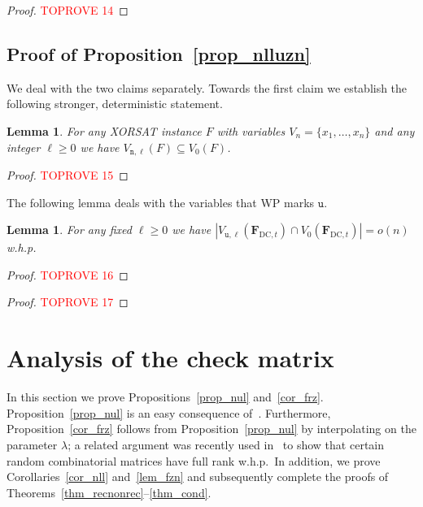 \documentclass[10pt,reqno]{amsart}
\numberwithin{equation}{section}
\renewcommand{\vec}[1]{\boldsymbol{#1}}
\renewcommand{\subset}{\subseteq}
\newcommand{\FDC}[1]{\PHI_{\mathrm{DC},{#1}}}
\newcommand{\frz}{V_0}
\newcommand{\unfrozen}{\mathtt{u}}
\newcommand{\nll}{\mathtt{n}}
\newcommand{\uzn}{\unfrozen}
\newcommand\PHI{\vec F}
\newcommand{\whp}{w.h.p.}
\newcommand\Prop{Proposition}
\newcommand\Thm{Theorem}
\newtheorem{lemma}[definition]{Lemma}
\begin{document}
\begin{proof}\textcolor{red}{TOPROVE 14}\end{proof}


\subsection{Proof of \Prop~\ref{prop_nlluzn}}\label{sec_prop_nlluzn}
We deal with the two claims separately.
Towards the first claim we establish the following stronger, deterministic statement.

\begin{lemma}\label{lem_nll}
	For any XORSAT instance $F$ with variables $V_n=\{x_1,\ldots,x_n\}$ and any integer $\ell\geq0$ we have $V_{\nll,\ell}(F)\subset\frz(F)$.
\end{lemma}
\begin{proof}\textcolor{red}{TOPROVE 15}\end{proof}

The following lemma deals with the variables that WP marks $\uzn$.

\begin{lemma}\label{lem_uzn}
	For any fixed $\ell\geq0$ we have $|V_{\uzn,\ell}(\FDC{t})\cap\frz(\FDC{t})|=o(n)$ \whp 
\end{lemma}

\newcommand{\nb}{\partial^{\leq\ell}}
\begin{proof}\textcolor{red}{TOPROVE 16}\end{proof}

\begin{proof}\textcolor{red}{TOPROVE 17}\end{proof}

\section{Analysis of the check matrix}\label{sec_nul}

\noindent
In this section we prove \Prop s~\ref{prop_nul} and~\ref{cor_frz}.
\Prop~\ref{prop_nul} is an easy consequence of~\cite[\Thm~1.1]{Maurice}.
Furthermore, \Prop~\ref{cor_frz} follows from \Prop~\ref{prop_nul} by interpolating on the parameter $\lambda$; a related argument was recently used in~\cite{fullrank} to show that certain random combinatorial matrices have full rank \whp\
In addition, we prove Corollaries~\ref{cor_nll} and~\ref{lem_fzn} and subsequently complete the proofs of \Thm s~\ref{thm_recnonrec}--\ref{thm_cond}.
\end{document}
